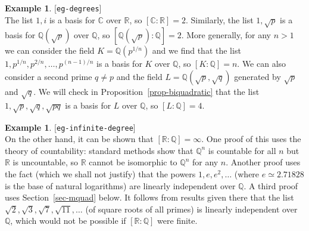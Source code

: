 \documentclass{amsart}
\newcommand{\lbl}[1]{\label{#1}\textup{[\texttt{#1}]}\ \\}
\newcommand{\lbl}{\label}
\newcommand{\Q}         {{\mathbb{Q}}}
\newcommand{\R}         {{\mathbb{R}}}
\newcommand{\C}         {{\mathbb{C}}}
\renewcommand{\:}{\colon}
\theoremstyle{definition}
\newtheorem{example}[theorem]{Example}
\begin{document}
\begin{example}\lbl{eg-degrees}
 The list $1,i$ is a basis for $\C$ over $\R$, so $[\C:\R]=2$.
 Similarly, the list $1,\sqrt{p}$ is a basis for $\Q(\sqrt{p})$ over
 $\Q$, so $[\Q(\sqrt{p}):\Q]=2$.  More generally, for any $n>1$ we can
 consider the field $K=\Q(p^{1/n})$ and we find that the list
 $1,p^{1/n},p^{2/n},\dotsc,p^{(n-1)/n}$ is a basis for $K$ over $\Q$,
 so $[K:\Q]=n$.  We can also consider a second prime $q\neq p$ and the
 field $L=\Q(\sqrt{p},\sqrt{q})$ generated by $\sqrt{p}$ and
 $\sqrt{q}$.  We will check in Proposition~\ref{prop-biquadratic} that
 the list $1,\sqrt{p},\sqrt{q},\sqrt{pq}$ is a basis for $L$ over
 $\Q$, so $[L:\Q]=4$.
\end{example}

\begin{example}\lbl{eg-infinite-degree}
 On the other hand, it can be shown that $[\R:\Q]=\infty$.  One proof
 of this uses the theory of countability: standard methods show that
 $\Q^n$ is countable for all $n$ but $\R$ is uncountable, so $\R$
 cannot be isomorphic to $\Q^n$ for any $n$.  Another proof uses the
 fact (which we shall not justify) that the powers $1,e,e^2,\dotsc$
 (where $e\simeq 2.71828$ is the base of natural logarithms) are
 linearly independent over $\Q$.  A third proof uses
 Section~\ref{sec-mquad} below.  It follows from results given there
 that the list $\sqrt{2},\sqrt{3},\sqrt{7},\sqrt{11},\dotsc$ (of
 square roots of all primes) is linearly independent over $\Q$, which
 would not be possible if $[\R:\Q]$ were finite.
\end{example}
\end{document}
